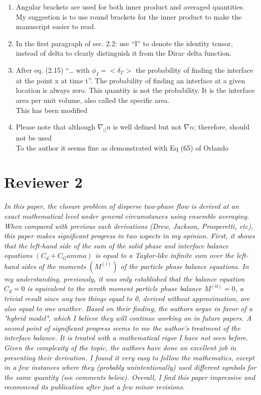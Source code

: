 \documentclass[10pt,a4paper]{article}
\newcommand{\tb}[1]{\color{blue}#1\color{black}}
\newcommand{\tr}[1]{\color{red}#1\color{black}}
\begin{document}
\begin{enumerate}
    \item Angular brackets are used for both inner product and averaged quantities. My suggestion is to use round brackets for the inner product to make the manuscript easier to read.
    \item In the first paragraph of sec. 2.2: use “I” to denote the identity tensor, instead of delta to
    clearly distinguish it from the Dirac delta function.
    \item After eq. (2.15) “… with $\phi_I = <\delta_\Gamma>$ the probability of finding the interface at the point x at
    time t”. The probability of finding an interface at a given location is always zero. This
    quantity is not the probability. It is the interface area per unit volume, also called the specific
    area.\\
    \tb{This has been modified}
    \item Please note that although $\nabla_{||} n$ is well defined but not $\nabla n$; therefore, should not be used
    \\
    \tr{To the author it seems fine as demonstrated with Eq (65) of Orlando }
\end{enumerate}


\section*{Reviewer 2}

\textit{In this paper, the closure problem of disperse two-phase flow is derived at an exact mathematical level under general circumstances using ensemble averaging. When compared with previous such derivations (Drew, Jackson, Prosperetti, etc), this paper makes significant progress in two aspects in my opinion. First, it shows that the left-hand side of the sum of the solid phase and interface balance equations $(C_d+C_Gamma)$ is equal to a Taylor-like infinite sum over the left-hand sides of the moments $(M^(i))$ of the particle phase balance equations. In my understanding, previously, it was only established that the balance equation $C_d =0$ is equivalent to the zeroth moment particle phase balance $M^(0)=0$, a trivial result since any two things equal to 0, derived without approximation, are also equal to one another. Based on their finding, the authors argue in favor of a "hybrid model", which I believe they will continue working on in future papers. A second point of significant progress seems to me the author's treatment of the interface balance. It is treated with a mathematical rigor I have not seen before.
Given the complexity of the topic, the authors have done an excellent job in presenting their derivation. I found it very easy to follow the mathematics, except in a few instances where they (probably unintentionally) used different symbols for the same quantity (see comments below). Overall, I find this paper impressive and recommend its publication after just a few minor revisions.}
\end{document}

